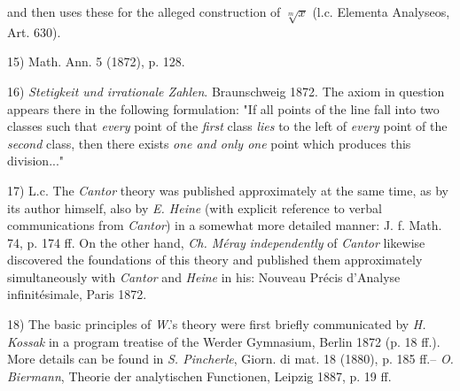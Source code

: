 \vfill
\leftline{\rule{2in}{0.4pt}}
\vspace{0.2cm}
{
\footnotesize
and then uses these for the alleged construction of $\sqrt[m]{x}$ (l.c. Elementa Analyseos, Art. 630).

15) Math. Ann. 5 (1872), p. 128.

16) \textit{Stetigkeit und irrationale Zahlen}. Braunschweig 1872. The axiom in question appears there in the following formulation: "If all points of the line fall into two classes such that \textit{every} point of the \textit{first} class \textit{lies} to the left of \textit{every} point of the \textit{second} class, then there exists \textit{one and only one} point which produces this division..."

17) L.c. The \textit{Cantor} theory was published approximately at the same time, as by its author himself, also by \textit{E. Heine} (with explicit reference to verbal communications from \textit{Cantor}) in a somewhat more detailed manner: J. f. Math. 74, p. 174 ff. On the other hand, \textit{Ch. Méray} \textit{independently} of \textit{Cantor} likewise discovered the foundations of this theory and published them approximately simultaneously with \textit{Cantor} and \textit{Heine} in his: Nouveau Précis d'Analyse infinitésimale, Paris 1872.

18) The basic principles of \textit{W}.'s theory were first briefly communicated by \textit{H. Kossak} in a program treatise of the Werder Gymnasium, Berlin 1872 (p. 18 ff.). More details can be found in \textit{S. Pincherle}, Giorn. di mat. 18 (1880), p. 185 ff.-- \textit{O. Biermann}, Theorie der analytischen Functionen, Leipzig 1887, p. 19 ff.

}
